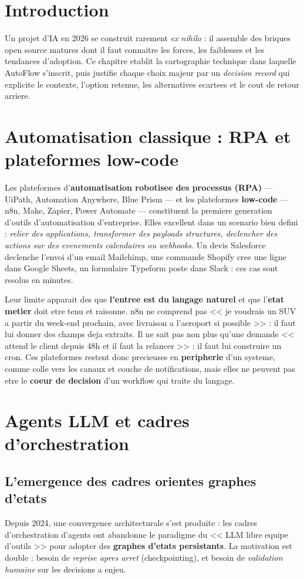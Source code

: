 \documentclass[12pt,a4paper,openany]{report}
\begin{document}
\section{Introduction}
Un projet d'IA en 2026 se construit rarement \emph{ex nihilo} : il assemble des briques open source matures dont il faut connaitre les forces, les faiblesses et les tendances d'adoption. Ce chapitre etablit la cartographie technique dans laquelle AutoFlow s'inscrit, puis justifie chaque choix majeur par un \emph{decision record} qui explicite le contexte, l'option retenue, les alternatives ecartees et le cout de retour arriere.

\section{Automatisation classique : RPA et plateformes low-code}

Les plateformes d'\textbf{automatisation robotisee des processus (RPA)} --- UiPath, Automation Anywhere, Blue Prism --- et les plateformes \textbf{low-code} --- n8n, Make, Zapier, Power Automate --- constituent la premiere generation d'outils d'automatisation d'entreprise. Elles excellent dans un scenario bien defini : \emph{relier des applications, transformer des payloads structures, declencher des actions sur des evenements calendaires ou webhooks}. Un devis Salesforce declenche l'envoi d'un email Mailchimp, une commande Shopify cree une ligne dans Google Sheets, un formulaire Typeform poste dans Slack : ces cas sont resolus en minutes.

Leur limite apparait des que \textbf{l'entree est du langage naturel} et que l'\textbf{etat metier} doit etre tenu et raisonne. n8n ne comprend pas << je voudrais un SUV a partir du week-end prochain, avec livraison a l'aeroport si possible >> : il faut lui donner des champs deja extraits. Il ne sait pas non plus qu'une demande << attend le client depuis 48h et il faut la relancer >> : il faut lui construire un cron. Ces plateformes restent donc precieuses en \textbf{peripherie} d'un systeme, comme colle vers les canaux et couche de notifications, mais elles ne peuvent pas etre le \textbf{coeur de decision} d'un workflow qui traite du langage.

\section{Agents LLM et cadres d'orchestration}

\subsection{L'emergence des cadres orientes graphes d'etats}
Depuis 2024, une convergence architecturale s'est produite : les cadres d'orchestration d'agents ont abandonne le paradigme du << LLM libre equipe d'outils >> pour adopter des \textbf{graphes d'etats persistants}. La motivation est double : besoin de \emph{reprise apres arret} (checkpointing), et besoin de \emph{validation humaine} sur les decisions a enjeu.
\end{document}
